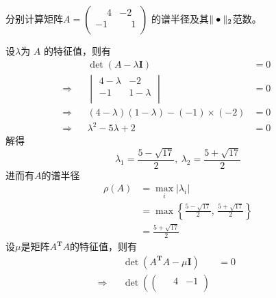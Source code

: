 \documentclass[11pt]{article}
\begin{document}
\begin{question}

    \questiontext
    {
        分别计算矩阵$A =
            \begin{pmatrix}
                \phantom{-}4 & -2           \\
                -1           & \phantom{-}1 \\
            \end{pmatrix}$
        的谱半径及其$\Arrowvert \bullet \Arrowvert_2$范数。
    }

    \answer
    {
        设$\lambda$为 $A$ 的特征值，则有
        \begin{align*}
                        &  & \det{(A - \lambda \mathbf{I})}                & = 0 &  &  & \\
            \Rightarrow &  & \begin{vmatrix}
                4 - \lambda & -2          \\
                -1          & 1 - \lambda \\
            \end{vmatrix}                     & = 0 &  &  & \\
            \Rightarrow &  & (4 - \lambda)(1 - \lambda) - (-1) \times (-2) & = 0 &  &  & \\
            \Rightarrow &  & \lambda^2 - 5 \lambda + 2                     & = 0 &  &  &
        \end{align*}
        解得
        \begin{equation*}
            \lambda_1 = \frac{5-\sqrt{17}}{2},\ \lambda_2 = \frac{5+\sqrt{17}}{2}
        \end{equation*}
        进而有$A$的谱半径
        \begin{align*}
            \rho(A) & = \max_i{|\lambda_i|}                                                 \\
                    & = \max{\left\{\frac{5-\sqrt{17}}{2},\, \frac{5+\sqrt{17}}{2}\right\}} \\
                    & = \frac{5+\sqrt{17}}{2}
        \end{align*}
        设$\mu$是矩阵$A^{\mathbf{T}}\!A$的特征值，则有
        \begin{align*}
                        &  & \det(A^{\mathbf{T}}\!A - \mu\mathbf{I})                                                             & = 0 &  &  & \\
            \Rightarrow &  & \det{\left(\begin{pmatrix}
                    \phantom{-}4 & -1           \\

\end{pmatrix}}
\end{align*}}
\end{question}
\end{document}
